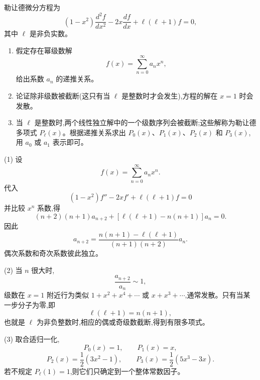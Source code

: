 \begin{question}
勒让德微分方程为
\[
(1-x^2)\frac{d^2f}{dx^2}-2x\frac{df}{dx}+\ell(\ell+1)f=0,
\]
其中 $\ell$ 是非负实数。
\begin{enumerate}
\item 假定存在幂级数解
\[
f(x)=\sum_{n=0}^{\infty}a_nx^n,
\]
给出系数 $a_n$ 的递推关系。
\item 论证除非级数被截断(这只有当 $\ell$ 是整数时才会发生),方程的解在 $x=1$ 时会发散。
\item 当 $\ell$ 是整数时,两个线性独立解中的一个级数序列会被截断;这些解称为勒让德多项式 $P_\ell(x)$。根据递推关系求出 $P_0(x)$、$P_1(x)$、$P_2(x)$ 和 $P_3(x)$,用 $a_0$ 或 $a_1$ 表示即可。
\end{enumerate}
\begin{solution}
(1) 设
\[
f(x)=\sum_{n=0}^{\infty}a_nx^n.
\]
代入
\[
(1-x^2)f''-2xf'+\ell(\ell+1)f=0
\]
并比较 $x^n$ 系数,得
\[
(n+2)(n+1)a_{n+2}+[\ell(\ell+1)-n(n+1)]a_n=0.
\]
因此
\[
a_{n+2}=\frac{n(n+1)-\ell(\ell+1)}{(n+1)(n+2)}a_n.
\]
偶次系数和奇次系数彼此独立。

(2) 当 $n$ 很大时,
\[
\frac{a_{n+2}}{a_n}\sim1,
\]
级数在 $x=1$ 附近行为类似 $1+x^2+x^4+\cdots$ 或 $x+x^3+\cdots$,通常发散。只有当某一步分子为零,即
\[
\ell(\ell+1)=n(n+1),
\]
也就是 $\ell$ 为非负整数时,相应的偶或奇级数截断,得到有限多项式。

(3) 取合适归一化,
\[
P_0(x)=1,
\qquad
P_1(x)=x,
\]
\[
P_2(x)=\frac12(3x^2-1),
\qquad
P_3(x)=\frac12(5x^3-3x).
\]
若不规定 $P_\ell(1)=1$,则它们只确定到一个整体常数因子。
\end{solution}
\end{question}

